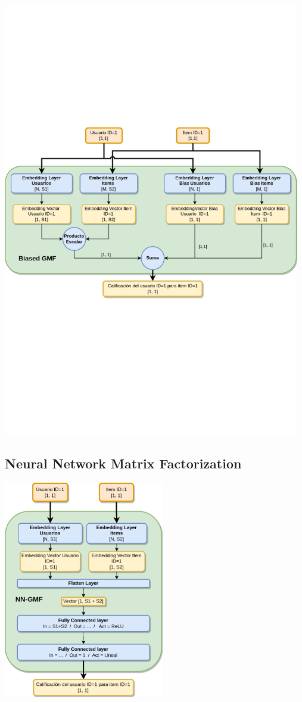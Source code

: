 \documentclass[11pt,a4paper,twoside]{thesis}
\begin{document}
\begin{center}
	\includegraphics[width=13cm]{./images/Biased-GMF.png}
\end{center}

\subsection{Neural Network Matrix Factorization}


\begin{center}
	\includegraphics[width=7cm]{./images/NN-MF.png}
\end{center}
\end{document}
